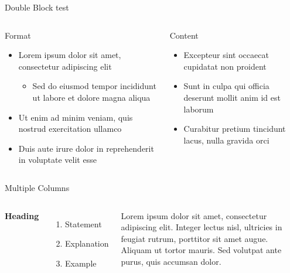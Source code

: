 \documentclass[aspectratio=169,xcolor=dvipsnames]{beamer}
\begin{document}

\begin{frame}{Double Block test}
\begin{columns}[T,onlytextwidth]
    \begin{block}{Format}
        \begin{itemize}
          \item Lorem ipsum dolor sit amet, consectetur adipiscing elit
          \begin{itemize}
            \item Sed do eiusmod tempor incididunt ut labore et dolore magna aliqua
          \end{itemize}
          \item Ut enim ad minim veniam, quis nostrud exercitation ullamco
          \item Duis aute irure dolor in reprehenderit in voluptate velit esse
        \end{itemize}
    \end{block}
    
    \begin{block}{Content}
        \begin{itemize}
          \item Excepteur sint occaecat cupidatat non proident
          \item Sunt in culpa qui officia deserunt mollit anim id est laborum
          \item Curabitur pretium tincidunt lacus, nulla gravida orci
        \end{itemize}
    \end{block}
\end{columns}
\end{frame}



\begin{frame}{Multiple Columns}
    \begin{columns}[c] %

        \textbf{Heading}
        \begin{enumerate}
            \item Statement
            \item Explanation
            \item Example
        \end{enumerate}

        Lorem ipsum dolor sit amet, consectetur adipiscing elit. Integer lectus nisl, ultricies in feugiat rutrum, porttitor sit amet augue. Aliquam ut tortor mauris. Sed volutpat ante purus, quis accumsan dolor.

    \end{columns}
\end{frame}
\end{document}
